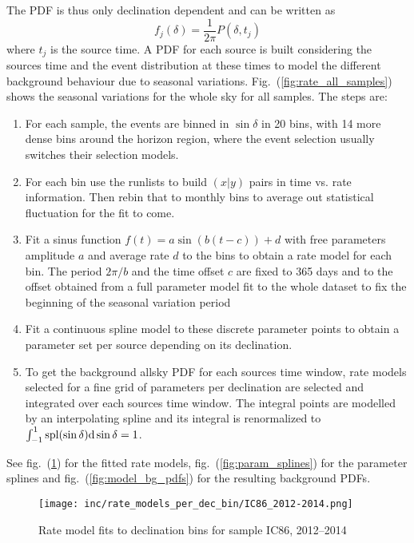 The PDF is thus only declination dependent and can be written as
\begin{equation}
  f_j(\delta) = \frac{1}{2\pi}P(\delta, t_j)
\end{equation}
where $t_j$ is the source time.
A PDF for each source is built considering the sources time and the event distribution at these times to model the different background behaviour due to seasonal variations.
Fig.~(\ref{fig:rate_all_samples}) shows the seasonal variations for the whole sky for all samples.
The steps are:
\begin{enumerate}
  \item For each sample, the events are binned in $\sin\delta$ in 20 bins, with 14 more dense bins around the horizon region, where the event selection usually switches their selection models.
  \item For each bin use the runlists to build $(x|y)$ pairs in time vs. rate information.
  Then rebin that to monthly bins to average out statistical fluctuation for the fit to come.
  \item Fit a sinus function $f(t) = a \sin(b(t-c)) + d$ with free parameters amplitude $a$ and average rate $d$ to the bins to obtain a rate model for each bin.
  The period $2\pi/b$ and the time offset $c$ are fixed to 365 days and to the offset obtained from a full parameter model fit to the whole dataset to fix the beginning of the seasonal variation period
  \item Fit a continuous spline model to these discrete parameter points to obtain a parameter set per source depending on its declination.
  \item To get the background allsky PDF for each sources time window, rate models selected for a fine grid of parameters per declination are selected and integrated over each sources time window.
  The integral points are modelled by an interpolating spline and its integral is renormalized to $\int_{-1}^{1} \mathrm{spl}(\sin\delta) \mathrm{d}\sin\delta = 1$.
\end{enumerate}

See fig.~(\ref{fig:dec_bin_rate_models}) for the fitted rate models, fig.~(\ref{fig:param_splines}) for the parameter splines and fig.~(\ref{fig:model_bg_pdfs}) for the resulting background PDFs.

\begin{figure}[htbp]
  \centering
  \texttt{[image: inc/rate\_models\_per\_dec\_bin/IC86\_2012-2014.png]}
  \caption{Rate model fits to declination bins for sample IC86, 2012–2014}
  \label{fig:dec_bin_rate_models}
\end{figure}

